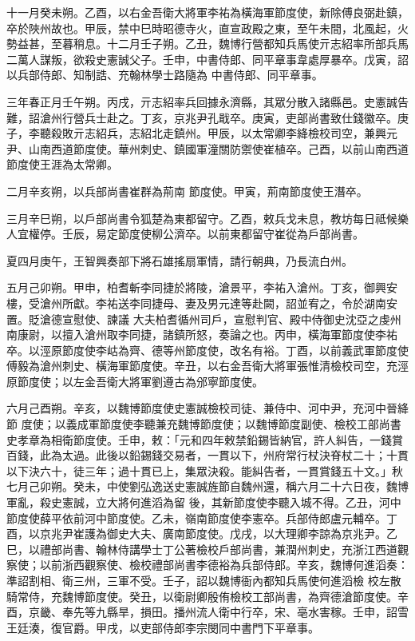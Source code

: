 \begin{pinyinscope}
 十一月癸未朔。乙酉，以右金吾衛大將軍李祐為橫海軍節度使，新除傅良弼赴鎮，卒於陜州故也。甲辰，禁中巳時昭德寺火，直宣政殿之東，至午未間，北風起，火勢益甚，至暮稍息。十二月壬子朔。乙丑，魏博行營都知兵馬使亓志紹率所部兵馬二萬人謀叛，欲殺史憲誠父子。壬申，中書侍郎、同平章事韋處厚暴卒。戊寅，詔以兵部侍郎、知制誥、充翰林學士路隨為
 中書侍郎、同平章事。



 三年春正月壬午朔。丙戌，亓志紹率兵回據永濟縣，其眾分散入諸縣邑。史憲誠告難，詔滄州行營兵士赴之。丁亥，京兆尹孔戢卒。庚寅，吏部尚書致仕錢徽卒。庚子，李聽殺敗亓志紹兵，志紹北走鎮州。甲辰，以太常卿李絳檢校司空，兼興元尹、山南西道節度使。華州刺史、鎮國軍潼關防禦使崔植卒。己酉，以前山南西道節度使王涯為太常卿。



 二月辛亥朔，以兵部尚書崔群為荊南
 節度使。甲寅，荊南節度使王潛卒。



 三月辛巳朔，以戶部尚書令狐楚為東都留守。乙酉，敕兵戈未息，教坊每日祗候樂人宜權停。壬辰，易定節度使柳公濟卒。以前東都留守崔從為戶部尚書。



 夏四月庚午，王智興奏部下將石雄搖扇軍情，請行朝典，乃長流白州。



 五月己卯朔。甲申，柏耆斬李同捷於將陵，滄景平，李祐入滄州。丁亥，御興安樓，受滄州所獻。李祐送李同捷母、妻及男元達等赴闕，詔並宥之，令於湖南安置。貶滄德宣慰使、諫議
 大夫柏耆循州司戶，宣慰判官、殿中侍御史沈亞之虔州南康尉，以擅入滄州取李同捷，諸鎮所怒，奏論之也。丙申，橫海軍節度使李祐卒。以涇原節度使李岵為齊、德等州節度使，改名有裕。丁酉，以前義武軍節度使傅毅為滄州刺史、橫海軍節度使。辛丑，以右金吾衛大將軍張惟清檢校司空，充涇原節度使；以左金吾衛大將軍劉遵古為邠寧節度使。



 六月己酉朔。辛亥，以魏博節度使史憲誠檢校司徒、兼侍中、河中尹，充河中晉絳節
 度使；以義成軍節度使李聽兼充魏博節度使；以魏博節度副使、檢校工部尚書史孝章為相衛節度使。壬申，敕：「元和四年敕禁鉛錫皆納官，許人糾告，一錢賞百錢，此為太過。此後以鉛錫錢交易者，一貫以下，州府常行杖決脊杖二十；十貫以下決六十，徒三年；過十貫已上，集眾決殺。能糾告者，一貫賞錢五十文。」秋七月己卯朔。癸未，中使劉弘逸送史憲誠旌節自魏州還，稱六月二十六日夜，魏博軍亂，殺史憲誠，立大將何進滔為留
 後，其新節度使李聽入城不得。乙丑，河中節度使薛平依前河中節度使。乙未，嶺南節度使李憲卒。兵部侍郎盧元輔卒。丁酉，以京兆尹崔護為御史大夫、廣南節度使。戊戌，以大理卿李諒為京兆尹。乙巳，以禮部尚書、翰林侍講學士丁公著檢校戶部尚書，兼潤州刺史，充浙江西道觀察使；以前浙西觀察使、檢校禮部尚書李德裕為兵部侍郎。辛亥，魏博何進滔奏：準詔割相、衛三州，三軍不受。壬子，詔以魏博衙內都知兵馬使何進滔檢
 校左散騎常侍，充魏博節度使。癸丑，以衛尉卿殷侑檢校工部尚書，為齊德滄節度使。辛酉，京畿、奉先等九縣旱，損田。播州流人衛中行卒，宋、亳水害稼。壬申，詔雪王廷湊，復官爵。甲戌，以吏部侍郎李宗閔同中書門下平章事。




\end{pinyinscope}
